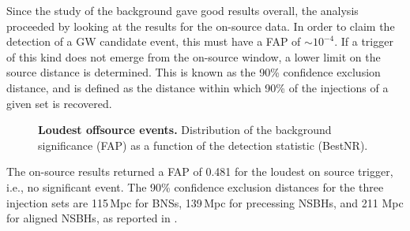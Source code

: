 \documentclass[binding=0.6cm, LaM]{sapthesis}
\begin{document}
	Since the study of the background gave good results overall,
	the analysis proceeded by looking at the results for the on-source data.
	In order to claim the detection of a GW candidate event, this 
	must have a FAP of $\sim 10^{-4}$.  If a trigger of this kind does not emerge from the on-source window,
	a lower limit on the source distance is determined.
        This is known as the 90\% confidence exclusion distance, and is
	defined as the distance within which 90\% of the injections of a given set is recovered.
        \begin{figure}[!t]
          \noindent
          \label{loudestoffsourcevent1}
          \centering
          \caption{\textbf{Loudest offsource events.} Distribution of the background significance (FAP) as a function of the detection statistic (BestNR).}
          \label{fig:loudestoffsourcevent1}
        \end{figure}
	The on-source results returned a FAP of 0.481 for the loudest on source trigger, i.e., no significant event. 
	The 90\% confidence exclusion distances for the three injection sets are 115\,Mpc for BNSs, 
	139\,Mpc for precessing NSBHs, and 211 Mpc for aligned NSBHs, as reported in \cite{43}.
\end{document}
